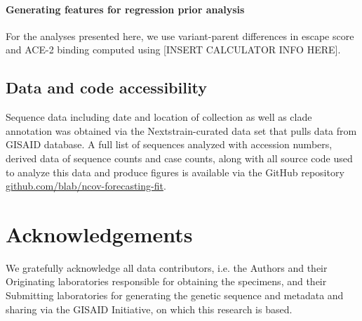 \documentclass[12pt,oneside,letterpaper]{article}
\begin{document}
\paragraph{Generating features for regression prior analysis}%

For the analyses presented here, we use variant-parent differences in escape score and ACE-2 binding computed using [INSERT CALCULATOR INFO HERE].

\subsection*{Data and code accessibility}

Sequence data including date and location of collection as well as clade annotation was obtained via the Nextstrain-curated data set that pulls data from GISAID database.
A full list of sequences analyzed with accession numbers, derived data of sequence counts and case counts, along with all source code used to analyze this data and produce figures is available via the GitHub repository \href{https://github.com/blab/ncov-forecasting-fit}{github.com/blab/ncov-forecasting-fit}.

\section*{Acknowledgements}

We gratefully acknowledge all data contributors, i.e. the Authors and their Originating laboratories responsible for obtaining the specimens, and their Submitting laboratories for generating the genetic sequence and metadata and sharing via the GISAID Initiative, on which this research is based.




\newpage

\appendix

\setcounter{figure}{0}
\setcounter{table}{0}
\setcounter{page}{1}
\renewcommand{\thefigure}{S\arabic{figure}}
\renewcommand{\thetable}{S\arabic{table}}
\renewcommand{\thepage}{S\arabic{page}}
\renewcommand{\thesubsection}{S\arabic{subsection}}
\end{document}
